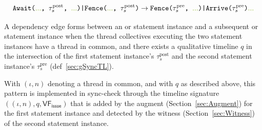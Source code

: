 
\begin{equation*}
    \texttt{Await(\codecomment{...}, $\tau_s^\mathrm{post}$, \codecomment{...})|Fence(\codecomment{...}, $\tau_s^\mathrm{post}$)} \to
    \texttt{Fence($\tau_s^\mathrm{pre}$, \codecomment{...})|Arrive($\tau_s^\mathrm{pre}$)\codecomment{...}}
\end{equation*}

A dependency edge forms between an  or  statement instance and a subsequent  or  statement instance when the thread collectives executing the two statement instances have a thread in common, and there exists a qualitative timeline $q$ in the intersection of the first statement instance's $\tau_s^\mathrm{post}$ and the second statement instance's $\tau_s^\mathrm{pre}$ (def~\ref{sec:gSyncTL}).

With $(\iota, n)$ denoting a thread in common, and with $q$ as described above, this pattern is implemented in sync-check through the timeline signature $((\iota, n), q, \mathsf{VF_{issue}})$ that is added by the augment (Section~\ref{sec:Augment}) for the first statement instance and detected by the witness (Section~\ref{sec:Witness}) of the second statement instance.


